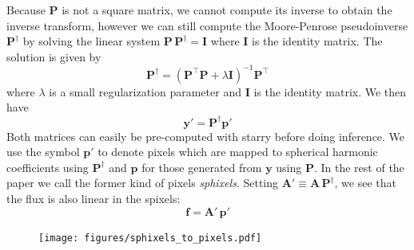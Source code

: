 \documentclass[modern]{aastex62}
\begin{document}
Because $\mathbf{P}$ is not a square matrix, we cannot compute its inverse to obtain the inverse transform, however we can still compute the Moore-Penrose pseudoinverse $\mathbf{P}^\dagger$ by solving the linear system $\mathbf{P}\,\mathbf{P}^\dagger=\mathbf{I}$ where $\mathbf{I}$ is the identity matrix. 
The solution is given by
\begin{equation}
\mathbf{P}^\dagger=\left(\mathbf{P}^{\top} \mathbf{P}+\lambda \mathbf{I}\right)^{-1} \mathbf{P}^{\top}
\end{equation}
where $\lambda$ is a small regularization parameter and $\mathbf{I}$ is the identity matrix.
We then have 
\begin{equation}
    \mathbf{y}'=\mathbf{P}^\dagger\mathbf{p}'
\end{equation}
Both matrices can easily be pre-computed with \textsf{starry} before doing inference.
We use the symbol $\mathbf{p}'$ to denote pixels which are mapped to spherical harmonic coefficients using $\mathbf{P}^\dagger$ and $\mathbf{p}$ for those generated from $\mathbf{y}$ using $\mathbf{P}$.
In the rest of the paper we call the former kind of pixels \emph{sphixels}.
Setting $\mathbf{A}'\equiv \mathbf{A}\,\mathbf{P}^\dagger$, we see that the flux is also linear in the spixels:
\begin{equation}
    \mathbf{f}=\mathbf{A}'\,\mathbf{p}'
    \label{eq:linear_model_pix}
\end{equation}

\begin{figure}[h!]
    \begin{centering}
    \texttt{[image: figures/sphixels\_to\_pixels.pdf]}
    \end{centering}
\end{figure}
\end{document}
